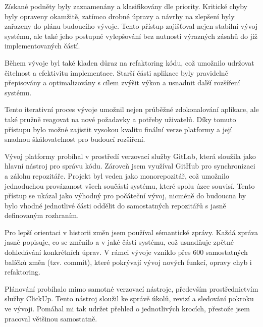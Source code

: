 Získané podněty byly zaznamenány a klasifikovány dle priority. 
Kritické chyby byly opraveny okamžitě, zatímco drobné úpravy a návrhy na zlepšení byly zařazeny do plánu budoucího vývoje. 
Tento přístup zajišťoval nejen stabilní vývoj systému, ale také jeho postupné vylepšování bez nutnosti výrazných zásahů do již implementovaných částí.

Během vývoje byl také kladen důraz na refaktoring kódu, což umožnilo udržovat čitelnost a efektivitu implementace. 
Starší části aplikace byly pravidelně přepisovány a optimalizovány s cílem zvýšit výkon a usnadnit další rozšíření systému.

Tento iterativní proces vývoje umožnil nejen průběžné zdokonalování aplikace, ale také pružně reagovat na nové požadavky a potřeby uživatelů. 
Díky tomuto přístupu bylo možné zajistit vysokou kvalitu finální verze platformy a její snadnou škálovatelnost pro budoucí rozšíření.

Vývoj platformy probíhal v prostředí verzovací služby GitLab, která sloužila jako hlavní nástroj pro správu kódu. 
Zároveň jsem využíval GitHub pro synchronizaci a zálohu repozitáře. 
Projekt byl veden jako monorepozitář, což umožnilo jednoduchou provázanost všech součástí systému, které spolu úzce souvisí. 
Tento přístup se ukázal jako výhodný pro počáteční vývoj, nicméně do budoucna by bylo vhodné jednotlivé části oddělit do samostatných repozitářů s jasně definovaným rozhraním.

Pro lepší orientaci v historii změn jsem používal sémantické zprávy. 
Každá zpráva jasně popisuje, co se změnilo a v jaké části systému, což usnadňuje zpětné dohledávání konkrétních úprav. 
V rámci vývoje vzniklo přes 600 samostatných balíčků změn (tzv. commit), které pokrývají vývoj nových funkcí, opravy chyb i refaktoring.

Plánování probíhalo mimo samotné verzovací nástroje, především prostřednictvím služby ClickUp. 
Tento nástroj sloužil ke správě úkolů, revizí a sledování pokroku ve vývoji. 
Pomáhal mi tak udržet přehled o jednotlivých krocích, přestože jsem pracoval většinou samostatně.



